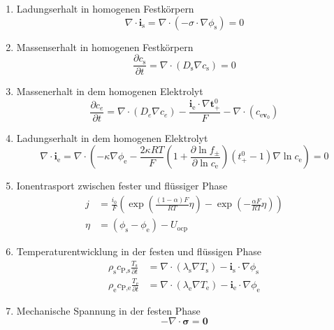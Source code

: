 \begin{enumerate}
    \item Ladungserhalt in homogenen Festkörpern
    \begin{equation}
        \nabla \cdot \boldsymbol{i}_{\text{s}} = \nabla \cdot \left( - \sigma \cdot \nabla \phi_{\text{s}} \right) = 0
    \end{equation}

    \item Massenserhalt in homogenen Festkörpern
    \begin{equation}
        \frac{\partial c_{\text{s}}}{\partial t}  = \nabla \cdot \left( D_{\text{s}} \nabla c_{\text{s}} \right) = 0
    \end{equation}

    \item Massenerhalt in dem homogenen Elektrolyt
    \begin{equation}
        \frac{\partial c_e}{\partial t} = \nabla \cdot \left( D_e   \nabla c_e \right) - \frac{\boldsymbol{i}_{\text{e}} \cdot    \nabla \boldsymbol{t}_+^0}{F} - \nabla \cdot \left( c_{\text   {e} \boldsymbol{v}_0}\right)
    \end{equation}

    \item Ladungserhalt  in dem homogenen Elektrolyt
    \begin{equation}
        \nabla \cdot \boldsymbol{i}_{\text{e}} = \nabla \cdot \left(    - \kappa \nabla \phi_{\text{e}}  -\frac{2\kappa RT}{F} \left(  1+ \frac{\partial \ln f_\pm}{\partial \ln c_{\text{e}}}\right)   \left( t_+^0-1\right) \nabla \ln c_{\text{e}} \right) = 0
    \end{equation}

    \item Ionentrasport zwischen fester und flüssiger Phase
    \begin{align}
        j &= \frac{i_0}{F}\left( \exp \left(\frac{\left(1-\alpha\right)  F}{RT}\eta \right) - \exp \left(-\frac{\alpha F}{RT}  \eta\right) \right)\\
        \eta &= (\phi_{\text{s}}-\phi_{\text{e}}) - U_{\text{ocp}}
    \end{align}

    \item Temperaturentwicklung in der festen und flüssigen Phase
    \begin{align}
        \rho_{\text{s}} c_{\text{P,s}} \frac{T_{\text{s}}}{\partial t} &= \nabla \cdot (\lambda_{\text{s}} \nabla T_{\text{s}}) - \boldsymbol{i}_{\text{s}} \cdot \nabla \phi_{\text{s}}\\
        \rho_{\text{e}} c_{\text{P,e}} \frac{T_{\text{e}}}{\partial t} &= \nabla \cdot (\lambda_{\text{e}} \nabla T_{\text{e}}) - \boldsymbol{i}_{\text{e}} \cdot \nabla \phi_{\text{e}}
    \end{align}
    \item Mechanische Spannung in der festen Phase
    \begin{equation}
        -\nabla \cdot \boldsymbol{\sigma} = \boldsymbol{0}
    \end{equation}
\end{enumerate}

